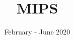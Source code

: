 \documentclass[]{slides}
\title{MIPS}
\date{February - June 2020}
\begin{document}
\begin{frame} \titlepage \end{frame}

\end{document}
